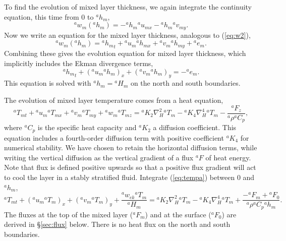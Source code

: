 \documentclass[11pt, a4paper,twoside]{article}
\newcommand{\rhb}[1]{{{}^{#1}\rho}}
\newcommand{\cp}[1]{{{}^{#1}C_p}}
\newcommand{\uu}[2]{{{}^{#1}u_{#2}}}
\newcommand{\vv}[2]{{{}^{#1}v_{#2}}}
\newcommand{\ww}[2]{{{}^{#1}w_{#2}}}
\newcommand{\ek}[1]{{{}^{#1}w_{ek}}}
\newcommand{\HH}[2]{{{}^{#1}H_{#2}}}
\newcommand{\kh}[1]{{{}^{#1}K_2}}
\newcommand{\kf}[1]{{{}^{#1}K_4}}
\newcommand{\e}[2]{{{}^{#1}e_{#2}}}
\newcommand{\h}[2]{{{}^{#1}h_{#2}}}
\newcommand{\T}[2]{{{}^{#1}T_{#2}}}
\newcommand{\F}[3]{{{}^{#1}F^{#3}_{#2}}}
\numberwithin{equation}{section}
\begin{document}
To find the evolution of mixed layer thickness, we again integrate the continuity equation, this time from $0$ to $\h{a}{m}$,
\begin{equation}\ww{a}{m}(\h{a}{m}) = - \h{a}{m}\uu{a}{mx} - \h{a}{m}\vv{a}{my}.\end{equation}
Now we write an equation for the mixed layer thickness, analogous to (\ref{eq:w2}),
\begin{equation}\label{eq:w0a}
\ww{a}{m}(\h{a}{m}) = \h{a}{m}_t + \uu{a}{m}\h{a}{mx} + \vv{a}{m} \h{a}{my}  + \e{a}{m}.
\end{equation}
Combining these gives the evolution equation for mixed layer thickness, which implicitly includes the Ekman divergence terms,
\begin{equation}\label{eq:hevmat}
\h{a}{m}_t + (\uu{a}{m}\h{a}{m})_x + (\vv{a}{m} \h{a}{m})_y =   - \e{a}{m}.
\end{equation}
This equation is solved with $\h{a}{m} = \HH{a}{m}$ on the north and south boundaries.

The evolution of mixed layer temperature comes from a heat equation,
\begin{equation}\label{eq:tempa}
\T{a}{mt} + \uu{a}{m} \T{a}{mx} + \vv{a}{m} \T{a}{my} + \ww{a}{m} \T{a}{mz} =  \kh{a} \nabla_H^2 \T{a}{m} - \kf{a}\nabla_H^4\T{a}{m} - \frac{{}^aF_z}{\rhb{a} \cp{a}},
\end{equation}
where $\cp{a}$ is the specific heat capacity and $\kh{a}$ a diffusion coefficient.
This equation includes a fourth-order diffusion term with positive coefficient $\kf{a}$ for numerical stability.
We have chosen to retain the horizontal diffusion terms, while writing the vertical diffusion as the vertical gradient of a flux ${}^aF$ of heat energy.
Note that flux is defined positive upwards so that a positive flux gradient will act to cool the layer in a stably stratified fluid.
Integrate (\ref{eq:tempa}) between $0$ and $\h{a}{m}$, \begin{equation}\label{eq:tempc}
\T{a}{mt} + (\uu{a}{m} \T{a}{m})_x + (\vv{a}{m} \T{a}{m})_y + \frac{\ek{a}\T{a}{m}}{\HH{a}{m}}  =  \kh{a} \nabla_H^2 \T{a}{m} - \kf{a}\nabla_H^4\T{a}{m}+ \frac{-\F{a}{m}{} + \F{a}{0}{}}{\rhb{a} \cp{a} \h{a}{m}}.
\end{equation}
The fluxes at the top of the mixed layer ($\F{a}{m}{}$) and at the surface ($\F{a}{0}{}$) are derived in \S \ref{sec:flux} below.
There is no heat flux on the north and south boundaries.
\end{document}
